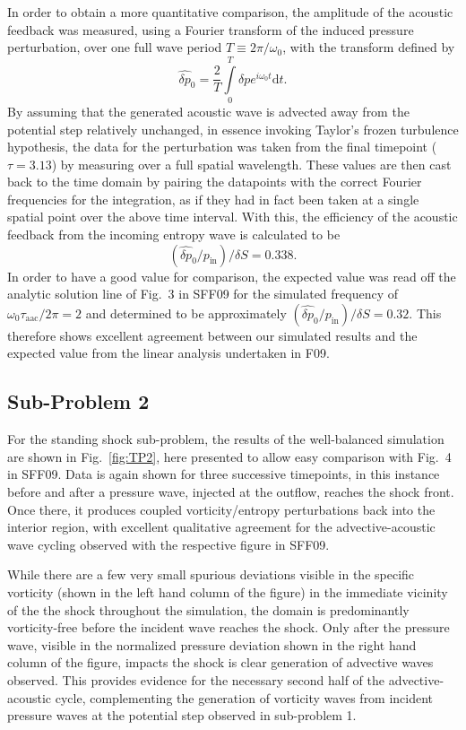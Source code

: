 In order to obtain a more quantitative comparison, the amplitude of the acoustic feedback was measured, using a Fourier transform of the induced pressure perturbation, over one full wave period $T\equiv2\pi/\omega_0$, with the transform defined by
\begin{equation}
\hat{\delta p}_0=\frac{2}{T}\int\limits_{0}^{T}\delta pe^{i\omega_0t}\textrm{d}t.
\end{equation}
By assuming that the generated acoustic wave is advected away from the potential step relatively unchanged, in essence invoking Taylor's frozen turbulence hypothesis, the data for the perturbation was taken from the final timepoint ($\tau=3.13$) by measuring over a full spatial wavelength. These values are then cast back to the time domain by pairing the datapoints with the correct Fourier frequencies for the integration, as if they had in fact been taken at a single spatial point over the above time interval. With this, the efficiency of the acoustic feedback from the incoming entropy wave is calculated to be $$\left(\hat{\delta p}_0/p_\textrm{in}\right)/\delta S=0.338.$$
In order to have a good value for comparison, the expected value was read off the analytic solution line of Fig.~3 in SFF09 for the simulated frequency of $\omega_0\tau_\textrm{aac}/2\pi=2$ and determined to be approximately $\left(\hat{\delta p}_0/p_\textrm{in}\right)/\delta S=0.32$. This therefore shows excellent agreement between our simulated results and the expected value from the linear analysis undertaken in F09.

\subsection{Sub-Problem 2}
\label{subsec:results_TP2}

For the standing shock sub-problem, the results of the well-balanced simulation are shown in Fig.~\ref{fig:TP2}, here presented to allow easy comparison with Fig.~4 in SFF09. Data is again shown for three successive timepoints, in this instance before and after a pressure wave, injected at the outflow, reaches the shock front. Once there, it produces coupled vorticity/entropy perturbations back into the interior region, with excellent qualitative agreement for the advective-acoustic wave cycling observed with the respective figure in SFF09.

While there are a few very small spurious deviations visible in the specific vorticity (shown in the left hand column of the figure) in the immediate vicinity of the the shock throughout the simulation, the domain is predominantly vorticity-free before the incident wave reaches the shock. Only after the pressure wave, visible in the normalized pressure deviation shown in the right hand column of the figure, impacts the shock is clear generation of advective waves observed. This provides evidence for the necessary second half of the advective-acoustic cycle, complementing the generation of vorticity waves from incident pressure waves at the potential step observed in sub-problem 1.

